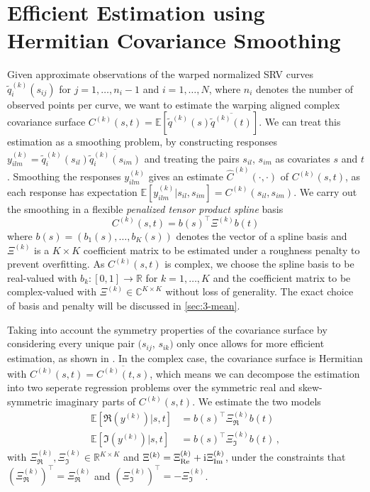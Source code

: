 \section{Efficient Estimation using Hermitian Covariance Smoothing}
\label{sec:3-cov}
Given approximate observations of the warped normalized SRV curves $\widetilde q^{(k)}_i(s_{ij})$ for $j = 1,\dots,n_i-1$ and $i=1,\dots,N$, where $n_i$ denotes the number of observed points per curve, we want to estimate the warping aligned complex covariance surface $C^{(k)}(s,t) = \mathbb{E}[\widetilde q^{(k)}(s)\overline{\widetilde q^{(k)}(t)}]$.
We can treat this estimation as a smoothing problem, by constructing responses $y^{(k)}_{ilm} = \widetilde q^{(k)}_i(s_{il}) \overline{\widetilde q^{(k)}_i(s_{im})}$ and treating the pairs $s_{il}$, $s_{im}$ as covariates $s$ and $t$.
Smoothing the responses $y^{(k)}_{ilm}$ gives an estimate $\hat C^{(k)}(\cdot, \cdot)$ of $C^{(k)}(s,t)$, as each response has expectation $\mathbb{E}[y^{(k)}_{ilm}|s_{il},s_{im}] = C^{(k)}(s_{il},s_{im})$. 
We carry out the smoothing in a flexible \emph{penalized tensor product spline} basis 
\begin{equation}
  C^{(k)}(s,t) = b(s)^\top \Xi^{(k)} b(t) 
\end{equation}
where $b(s) = (b_1(s),\dots,b_K(s))$ denotes the vector of a spline basis and $\Xi^{(k)}$ is a $K \times K$ coefficient matrix to be estimated under a roughness penalty to prevent overfitting. 
As $C^{(k)}(s,t)$ is complex, we choose the spline basis to be real-valued with $b_k : [0,1] \rightarrow \mathbb{R}$ for $k = 1,\dots,K$ and the coefficient matrix to be complex-valued with $\Xi^{(k)} \in \mathbb{C}^{K \times K}$ without loss of generality.
The exact choice of basis and penalty will be discussed in \cref{sec:3-mean}.

Taking into account the symmetry properties of the covariance surface by considering every unique pair $(s_{ij}$, $s_{ik})$ only once allows for more efficient estimation, as shown in \cite{CederbaumScheiplGreven2018}. 
In the complex case, the covariance surface is Hermitian with $C^{(k)}(s,t) = \overline{C^{(k)}(t,s)}$, which means we can decompose the estimation into two seperate regression problems over the symmetric real and skew-symmetric imaginary parts of $C^{(k)}(s,t)$.
We estimate the two models
\begin{align}
  \mathbb{E}[\Re(y^{(k)})|s,t] &= b(s)^\top \Xi^{(k)}_{\Re} b(t) \\
  \mathbb{E}[\Im(y^{(k)})|s,t] &= b(s)^\top \Xi^{(k)}_{\Im} b(t)\,,
\end{align}
with $\Xi^{(k)}_\Re, \Xi^{(k)}_\Im \in \mathbb{R}^{K\times K}$ and $\Xi^{(k)} = \Xi^{(k)}_{\mathrm{Re}} + \mathrm{i}\mkern1mu \Xi^{(k)}_{\mathrm{Im}}$, under the constraints that $(\Xi^{(k)}_\Re)^\top = \Xi^{(k)}_\Re$ and $(\Xi^{(k)}_\Im)^\top = - \Xi^{(k)}_\Im$.

